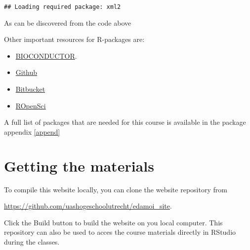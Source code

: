 \documentclass[]{book}
\newenvironment{Shaded}{\begin{snugshade}}{\end{snugshade}}
\newcommand{\DecValTok}[1]{\textcolor[rgb]{0.00,0.00,0.81}{#1}}
\newcommand{\KeywordTok}[1]{\textcolor[rgb]{0.13,0.29,0.53}{\textbf{#1}}}
\newcommand{\NormalTok}[1]{#1}
\newcommand{\OperatorTok}[1]{\textcolor[rgb]{0.81,0.36,0.00}{\textbf{#1}}}
\newcommand{\StringTok}[1]{\textcolor[rgb]{0.31,0.60,0.02}{#1}}
\providecommand{\tightlist}{%
  \setlength{\itemsep}{0pt}\setlength{\parskip}{0pt}}
\begin{document}
\begin{verbatim}
## Loading required package: xml2
\end{verbatim}

\begin{Shaded}
\end{Shaded}

As can be discovered from the code above

Other important resources for R-packages are:

\begin{itemize}
\tightlist
\item
  \href{https://www.bioconductor.org/}{BIOCONDUCTOR}.
\item
  \href{https://github.com}{Github}
\item
  \href{https://bitbucket.org/}{Bitbucket}
\item
  \href{https://ropensci.org/packages/}{ROpenSci}
\end{itemize}

A full list of packages that are needed for this course is available in the package appendix \ref{append}

\hypertarget{getting-the-materials}{%
\section{Getting the materials}\label{getting-the-materials}}

To compile this website locally, you can clone the website repository from

\url{https://github.com/uashogeschoolutrecht/edamoi_site}.

Click the Build button to build the website on you local computer.
This repository can also be used to acces the course materials directly in RStudio during the classes.
\end{document}
